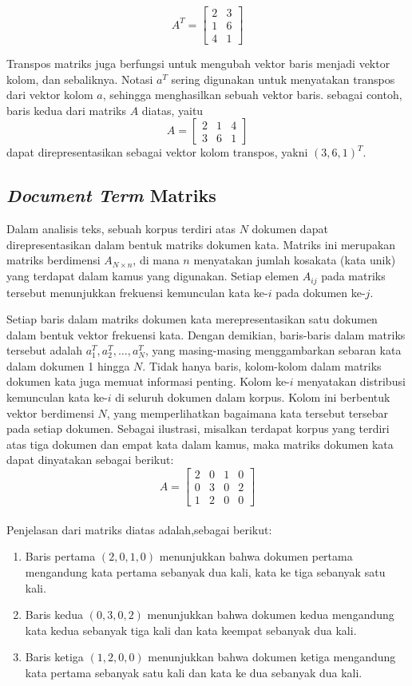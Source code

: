 \documentclass[a4paper,12pt]{report}
\numberwithin{equation}{chapter}
\begin{document}
\[
A^T = \begin{bmatrix}
    2 & 3\\
    1 & 6\\
    4 & 1
\end{bmatrix}
\]

Transpos matriks juga berfungsi untuk mengubah vektor baris menjadi vektor kolom, dan sebaliknya. Notasi $a^T$ sering digunakan untuk menyatakan transpos dari vektor kolom $a$, sehingga menghasilkan sebuah vektor baris. sebagai contoh, baris kedua dari matriks $A$ diatas, yaitu 
\[
A = \begin{bmatrix}
    2 & 1 & 4\\
    3 & 6 & 1
\end{bmatrix}
\]
dapat direpresentasikan sebagai vektor kolom transpos, yakni $(3,6,1)^T$.

\subsection{\textit{Document Term} Matriks}
Dalam analisis teks, sebuah korpus terdiri atas $N$ dokumen dapat direpresentasikan dalam bentuk matriks dokumen kata. Matriks ini merupakan matriks berdimensi $A_{N \times n}$, di mana $n$ menyatakan jumlah kosakata (kata unik) yang terdapat dalam kamus yang digunakan. Setiap elemen $A_{ij}$ pada matriks tersebut menunjukkan frekuensi kemunculan kata ke-$i$ pada dokumen ke-$j$.

Setiap baris dalam matriks dokumen kata merepresentasikan satu dokumen dalam bentuk vektor frekuensi kata. Dengan demikian, baris-baris dalam matriks tersebut adalah $a_1^T, a_2^T, \ldots, a_N^T$, yang masing-masing menggambarkan sebaran kata dalam dokumen 1 hingga $N$. Tidak hanya baris, kolom-kolom dalam matriks dokumen kata juga memuat informasi penting. Kolom ke-$i$ menyatakan distribusi kemunculan kata ke-$i$ di seluruh dokumen dalam korpus. Kolom ini berbentuk vektor berdimensi $N$, yang memperlihatkan bagaimana kata tersebut tersebar pada setiap dokumen. Sebagai ilustrasi, misalkan terdapat korpus yang terdiri atas tiga dokumen dan empat kata dalam kamus, maka matriks dokumen 
kata dapat dinyatakan sebagai berikut:
\[
A = \begin{bmatrix}
    2 & 0 & 1 & 0\\
    0 & 3 & 0 & 2\\
    1 & 2 & 0 & 0
\end{bmatrix}
\]
\\
Penjelasan dari matriks diatas adalah,sebagai berikut:
\begin{enumerate}
    \item Baris pertama $(2,0,1,0)$ menunjukkan bahwa dokumen pertama mengandung kata pertama sebanyak dua kali, kata ke tiga sebanyak satu kali.
    \item Baris kedua $( 0,3,0,2)$ menunjukkan bahwa dokumen kedua mengandung kata kedua sebanyak tiga kali dan kata keempat sebanyak dua kali.
    \item Baris ketiga $(1,2,0,0)$ menunjukkan bahwa dokumen ketiga mengandung kata pertama sebanyak satu kali dan kata ke dua sebanyak dua kali.
\end{enumerate}
\end{document}
